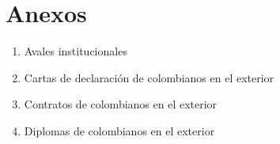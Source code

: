 
\section*{Anexos}
\begin{enumerate}
\item Avales institucionales
\item Cartas de declaración de colombianos en el exterior
\item Contratos de colombianos en el exterior
\item Diplomas de colombianos en el exterior
\end{enumerate}

